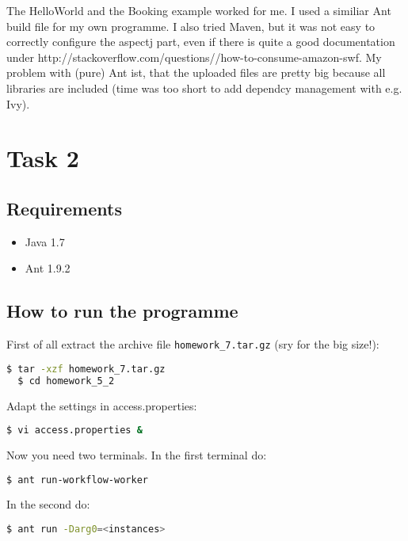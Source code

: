 \documentclass{article}
\begin{document}
The HelloWorld and the Booking example worked for me. I used a similiar Ant build file for my own programme. I also tried Maven, but it was not easy to correctly configure the aspectj part, even if there is quite a good documentation under http\-://\-stackoverflow.\-com/\-questions//\-how-\-to-\-consume-\-amazon-\-swf. My problem with (pure) Ant ist, that the uploaded files are pretty big because all libraries are included (time was too short to add dependcy management with e.g. Ivy).

\section{Task 2}
\subsection{Requirements}

\begin{itemize}
\item Java 1.7
\item Ant 1.9.2
\end{itemize}


\subsection{How to run the programme}

First of all extract the archive file \texttt{homework\_7.tar.gz} (sry for the big size!):

\begin{lstlisting}[language=bash, deletekeywords={cd}]
  $ tar -xzf homework_7.tar.gz
  $ cd homework_5_2
\end{lstlisting}

Adapt the settings in access.properties:

\begin{lstlisting}[language=bash, deletekeywords={cd}]
  $ vi access.properties & 
\end{lstlisting}

Now you need two terminals. In the first terminal do:

\begin{lstlisting}[language=bash]
  $ ant run-workflow-worker
\end{lstlisting}

In the second do:

\begin{lstlisting}[language=bash]
  $ ant run -Darg0=<instances>
\end{lstlisting}
\end{document}
